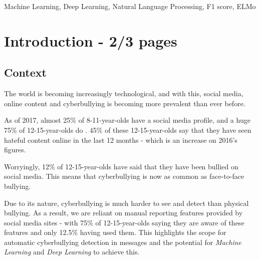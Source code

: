 \documentclass[12pt,a4paper]{article}
\begin{document}
\begin{keywords}
	Machine Learning, Deep Learning, Natural Language Processing, F1 score, ELMo
\end{keywords}



\section{Introduction - 2/3 pages}

\subsection{Context}
The world is becoming increasingly technological, and with this, social media, online content and cyberbullying is becoming more prevalent than ever before. 
 
As of 2017, almost 25\% of 8-11-year-olds have a social media profile, and a huge 75\% of 12-15-year-olds do \cite[p.5]{Ofcom}. 45\% of these 12-15-year-olds say that they have seen hateful content online in the last 12 months - which is an increase on 2016's figures.

Worryingly, 12\% of 12-15-year-olds have said that they have been bullied on social media. This means that cyberbullying is now as common as face-to-face bullying.

Due to its nature, cyberbullying is much harder to see and detect than physical bullying. As a result, we are reliant on manual reporting features provided by social media sites - with 75\% of 12-15-year-olds saying they are aware of these features \cite[p.5]{Ofcom} and only 12.5\% having used them. This highlights the scope for automatic cyberbullying detection in messages and the potential for \textit{Machine Learning} and \textit{Deep Learning} to achieve this.
\end{document}
